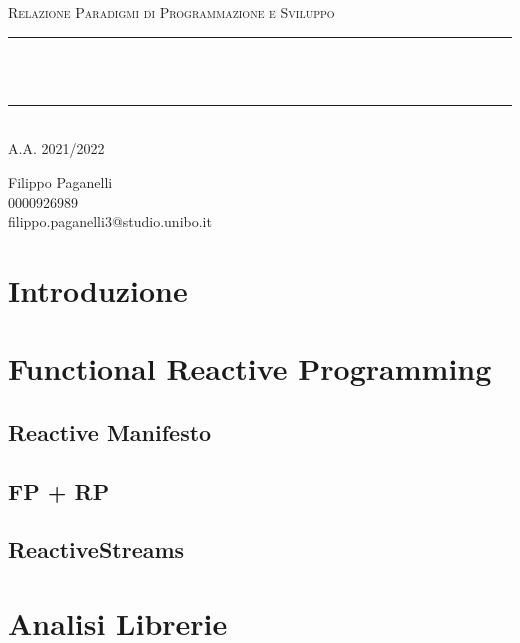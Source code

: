 \documentclass[12pt]{article}
\begin{document}

\begin{titlepage}

\newcommand{\HRule}{\rule{\linewidth}{0.5mm}}

\center

\textsc{\Large Relazione Paradigmi di Programmazione e Sviluppo}\\[0.5cm]

\HRule \\[0.4cm]
 \\
\HRule \\[0.4cm]
\center A.A. 2021/2022
\vfill

\begin{flushleft}
Filippo Paganelli \\ 0000926989 \\ filippo.paganelli3@studio.unibo.it
\end{flushleft}

\end{titlepage}

\tableofcontents

\newpage
\section{Introduzione}

\newpage
\section{Functional Reactive Programming}
\subsection{Reactive Manifesto}
\subsection{FP + RP}
\subsection{ReactiveStreams}

\newpage
\section{Analisi Librerie}
\end{document}
